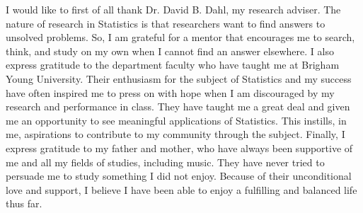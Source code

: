 I would like to first of all thank Dr. David B. Dahl, my research adviser. The nature of research in Statistics is that researchers want to find answers to unsolved problems. So, I am grateful for a mentor that encourages me to search, think, and study on my own when I cannot find an answer elsewhere.  I also express gratitude to the department faculty who have taught me at Brigham Young University. Their enthusiasm for the subject of Statistics and my success have often inspired me to press on with hope when I am discouraged by my research and performance in class. They have taught me a great deal and given me an opportunity to see meaningful applications of Statistics. This instills, in me, aspirations to contribute to my community through the subject. Finally, I express gratitude to my father and mother, who have always been supportive of me and all my fields of studies, including music. They have never tried to persuade me to study something I did not enjoy. Because of their unconditional love and support, I believe I have been able to enjoy a fulfilling and balanced life thus far.
